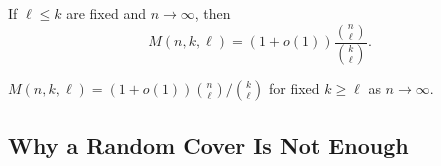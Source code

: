 \begin{conjecture}\label{conj:erdos-hanani}
    If \(\ell \le k\) are fixed and \(n \to \infty\), then
    \[
        M(n,k,\ell) = (1 + o(1)) \frac{\binom{n}{\ell}}{\binom{k}{\ell}} .
    \]
\end{conjecture}

\begin{theorem}[R\"odl, 1985]\label{thm:rodl}
    \(M(n,k,\ell) = (1 + o(1)) \binom{n}{\ell} \big/ \binom{k}{\ell}\) for fixed \(k \ge \ell\) as \(n \to \infty\).
\end{theorem}

\subsection{Why a Random Cover Is Not Enough}\label{sec:random-cover-fails}

